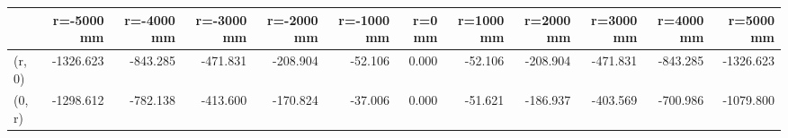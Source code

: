 \documentclass[convert={convertexe={magick.exe}}]{standalone}
\begin{document}
\begin{tabular}{lrrrrrrrrrrr}
\toprule
{} &  r=-5000 mm &  r=-4000 mm &  r=-3000 mm &  r=-2000 mm &  r=-1000 mm &  r=0 mm &  r=1000 mm &  r=2000 mm &  r=3000 mm &  r=4000 mm &  r=5000 mm \\
\midrule
(r, 0) &   -1326.623 &    -843.285 &    -471.831 &    -208.904 &     -52.106 &   0.000 &    -52.106 &   -208.904 &   -471.831 &   -843.285 &  -1326.623 \\
(0, r) &   -1298.612 &    -782.138 &    -413.600 &    -170.824 &     -37.006 &   0.000 &    -51.621 &   -186.937 &   -403.569 &   -700.986 &  -1079.800 \\
\bottomrule
\end{tabular}
\end{document}
